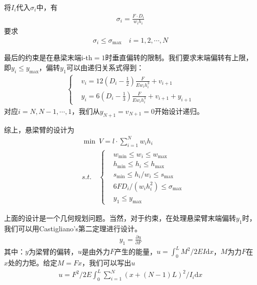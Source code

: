     将$I_i$代入${\sigma}_i$中，有
    \begin{align*}
        {\sigma}_i=\frac{F\cdot D_i}{w_ih_i}
    \end{align*}
    要求
    \begin{align*}
        {\sigma}_i \leqslant {\sigma}_{\max}\quad i=1,2,\cdots,N
    \end{align*}
    \par
    最后的约束是在悬梁末端i-th$=1$时垂直偏转的限制。我们要求末端偏转有上限，即$y_i\leqslant y_{\max}$，偏转$y_1$可以由递归关系式得到：
    \begin{align*}
     \left\{
    \begin{aligned}
    &v_i=12 \left( D_i-\frac12 \right) \frac {F}{Ew_ih_i^3}+v_{i+1}\\
    &y_i=6 \left( D_i-\frac13 \right) \frac {F}{Ew_ih_i^3}+v_{i+1}+y_{i+1}
    \end{aligned}
        \right.
    \end{align*}
    对应$i=N,N-1,\cdots,1$，我们从$y_{N+1}=v_{N+1}=0$开始设计递归。
    \par
    综上，悬梁臂的设计为
    \begin{align*}
    &\mathop{\min}\  V=l\cdot \mathop{\sum}\limits_{i=1}^{N}w_ih_i\\
    &s.t.\quad \left\{
    \begin{aligned}
    &w_{\min}\leqslant w_i\leqslant w_{\max}\\
    &h_{\min}\leqslant h_i\leqslant h_{\max}\\
    &s_{\min}\leqslant h_i/w_i\leqslant s_{\max}\\
    &6FD_i/(w_ih_i^2)\leqslant {\sigma}_{\max}\\
    &y_1\leqslant y_{\max}
    \end{aligned}
        \right.
    \end{align*}
    \par
    上面的设计是一个几何规划问题。当然，对于约束，在处理悬梁臂末端偏转$y_1$时，我们可以用Castigliano's第二定理进行设计。
    \begin{align*}
    y_1 = \frac{\partial u}{\partial F}
    \end{align*}
    其中：$y$为梁臂的偏转，$u$是由外力$F$产生的能量，$u={\int}_0^LM^2/2EI\mathrm{d}x$，$M$为力$F$在$x$处的力矩。给定$M=Fx$，我们可以写出$u$
    \begin{align*}
    u = F^2/2  E \int_0^L \mathop{\sum}\limits_{i=1}^{N}(x+(N-1)L)^2/I_i  \mathrm{d}x
    \end{align*}

